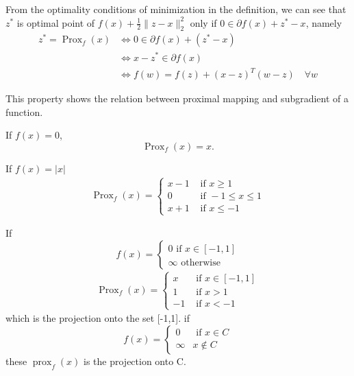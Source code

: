 \begin{properties}
From the optimality conditions of minimization in the definition, we can see that $z^*$ is optimal point of $f(x)+\frac12 \|z-x\|_2^2$ only if $0\in \partial f(x) + z^*-x$, namely
\begin{equation}
\begin{aligned}
z^{*}=\operatorname{Prox}_{f}(x) & \Longleftrightarrow 0 \in \partial f(x)+\left(z^{*}-x\right) \\
& \Longleftrightarrow x-z^{*} \in \partial f(x) \\
& \Longleftrightarrow f(w)=f(z)+(x-z)^{T}(w-z)\quad \forall w
\end{aligned}
\end{equation}
\end{properties}
This property shows the relation between proximal mapping  and subgradient of  a function.


\begin{example}
If $f(x)=0$, 
$$
\operatorname{Prox}_{f}(x)=x.
$$
\end{example}
\begin{example}
If $f(x)=|x|$
$$
\begin{array}{l} 
\operatorname{Prox}_{f}(x)=\left\{\begin{array}{cl}
x-1 & \text { if } x\geqslant 1 \\
0 & \text { if } -1 \leqslant x \leqslant 1    \\
x+1 & \text { if } x \leqslant-1
\end{array}\right.
\end{array}
$$	
	\end{example}
\begin{example}
If 
	$$
	f(x)=\left\{\begin{array}{l}
	0 \text { if } x \in[-1,1] \\
	\infty \text { otherwise }
	\end{array}\right.
	$$
$$ 	\begin{array}{l}
	\operatorname{Prox}_{f}(x)=\left\{\begin{array}{cl}
			x & \text { if } x \in [-1, 1] \\
			1 & \text { if } x>1   \\
			-1 & \text { if } x < -1
		\end{array}\right.
	\end{array}  $$
which is the projection onto the set [-1,1].
if $$
f(x)=\left\{\begin{array}{ll}
0 & \text { if } x \in C \\
\infty & x \notin C
\end{array}\right.
$$  these $ \operatorname{prox}_{f}(x) $ is the projection onto C.
	\end{example}
	
